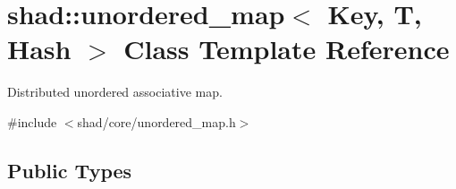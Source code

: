 \hypertarget{classshad_1_1unordered__map}{\section{shad\-:\-:unordered\-\_\-map$<$ Key, T, Hash $>$ Class Template Reference}
\label{classshad_1_1unordered__map}
}


Distributed unordered associative map.  




{\ttfamily \#include $<$shad/core/unordered\-\_\-map.\-h$>$}

\subsection*{Public Types}
